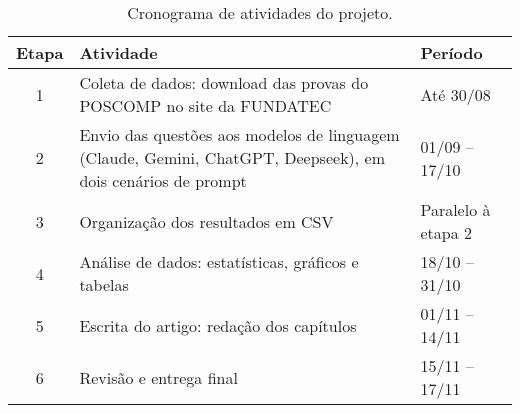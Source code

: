 \documentclass[brazilian, spanish, english]{RBIEarticle}
\begin{document}
\begin{table}[H]
    \caption{Cronograma de atividades do projeto.}
    \label{tab:cronograma}
    \centering\footnotesize%
    \begin{tabular}{|c|p{7cm}|l|}
        \hline
        \rowcolor{gray} \textbf{Etapa} & \textbf{Atividade} & \textbf{Período} \\
        \hline
        1 & Coleta de dados: download das provas do POSCOMP no site da FUNDATEC & Até 30/08 \\
        \hline
        2 & Envio das questões aos modelos de linguagem (Claude, Gemini, ChatGPT, Deepseek), em dois cenários de prompt & 01/09 – 17/10 \\
        \hline
        3 & Organização dos resultados em CSV & Paralelo à etapa 2 \\
        \hline
        4 & Análise de dados: estatísticas, gráficos e tabelas & 18/10 – 31/10 \\
        \hline
        5 & Escrita do artigo: redação dos capítulos & 01/11 – 14/11 \\
        \hline
        6 & Revisão e entrega final & 15/11 – 17/11 \\
        \hline
    \end{tabular}
\end{table}


\printbibliography
\end{document}
